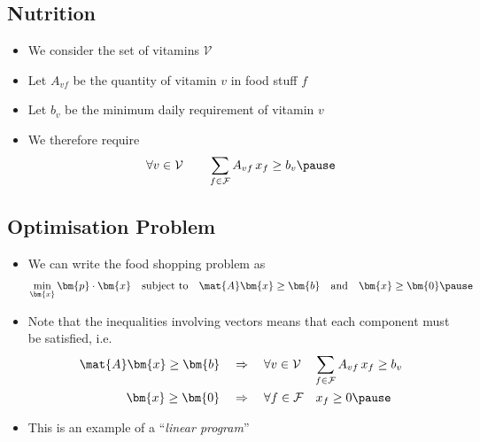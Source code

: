 
\begin{slide}
\section{Nutrition}

\begin{PauseHighLight}
  \begin{itemize}
  \item We consider the set of vitamins $\mathcal{V}$\pause
  \item Let $A_{vf}$ be the quantity of vitamin $v$ in food stuff $f$\pause
  \item Let $b_v$ be the minimum daily requirement of vitamin $v$\pause
  \item We therefore require
    \begin{align*}
      \forall v \in \mathcal{V} \quad\quad \sum_{f\in\mathcal{F}} A_{vf}\,x_f
      \geq b_v\pause
    \end{align*}
  \end{itemize}
\end{PauseHighLight}

\end{slide}


\begin{slide}
\section{Optimisation Problem}

\begin{PauseHighLight}
  \begin{itemize}
  \item We can write the food shopping problem as
    \begin{align*}
      \min_{\bm{x}} \bm{p} \cdot \bm{x}  \quad \text{subject to}
      \quad \mat{A} \bm{x} \geq \bm{b} \quad \text{and} \quad \bm{x} \geq \bm{0}\pause
    \end{align*}
  \item Note that the inequalities involving vectors means that each
    component must be satisfied, i.e.
    \begin{align*}
     \mat{A} \bm{x} \geq \bm{b} \quad &\Rightarrow \quad  \forall v \in  \mathcal{V}
     \quad \sum_{f\in\mathcal{F}} A_{vf}\,x_f \geq b_v \\
     \bm{x} \geq \bm{0} \quad  &\Rightarrow \quad \forall f \in \mathcal{F}
     \quad x_f \geq 0 \pause
    \end{align*}
  \item This is an example of a ``\emph{linear program}''\pause
  \end{itemize}
\end{PauseHighLight}

\end{slide}

